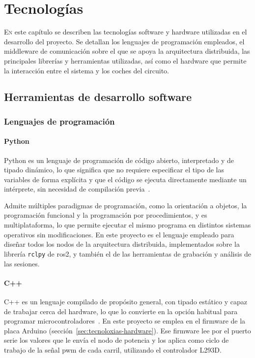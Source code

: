 \chapter{Tecnologías}
\label{chap:tecnologias}

\lettrine{E}{n} este capítulo se describen las tecnologías software y hardware utilizadas en el desarrollo del proyecto. Se detallan los lenguajes de programación empleados, el middleware de comunicación sobre el que se apoya la arquitectura distribuida, las principales librerías y herramientas utilizadas, así como el hardware que permite la interacción entre el sistema y los coches del circuito.

\section{Herramientas de desarrollo software}

\subsection{Lenguajes de programación}
\subsubsection{Python}

Python es un lenguaje de programación de código abierto, interpretado y de tipado dinámico, lo que significa que no requiere especificar el tipo de las variables de forma explícita y que el código se ejecuta directamente mediante un intérprete, sin necesidad de compilación previa~\cite{python}.

Admite múltiples paradigmas de programación, como la orientación a objetos, la programación funcional y la programación por procedimientos, y es multiplataforma, lo que permite ejecutar el mismo programa en distintos sistemas operativos sin modificaciones. En este proyecto es el lenguaje empleado para diseñar todos los nodos de la arquitectura distribuida, implementados sobre la librería \texttt{rclpy} de \gls{ros2}, y también el de las herramientas de grabación y análisis de las sesiones.

\subsubsection{C++}

C++ es un lenguaje compilado de propósito general, con tipado estático y capaz de trabajar cerca del hardware, lo que lo convierte en la opción habitual para programar microcontroladores~\cite{cpp}. En este proyecto se emplea en el firmware de la placa Arduino (sección~\ref{sec:tecnoloxias-hardware}). Ese firmware lee por el puerto serie los valores que le envía el nodo de potencia y los aplica como ciclo de trabajo de la señal \gls{pwm} de cada carril, utilizando el controlador L293D.

